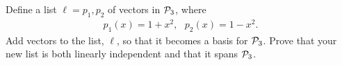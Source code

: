 \begin{question}
	\normalfont
	
	
	Define a list $\ell = p_1, p_2$ \hspace{.1cm}of vectors in $\P_3$, where
	\begin{align*}
		p_1(x) = 1+x^2,\ \ \ 
		p_2(x) = 1-x^2.
	\end{align*}
	Add vectors to the list, $\ell$, so that it becomes a basis for $\P_3$.  Prove that your new list is both linearly independent and that it spans $\P_3$.
\end{question}
